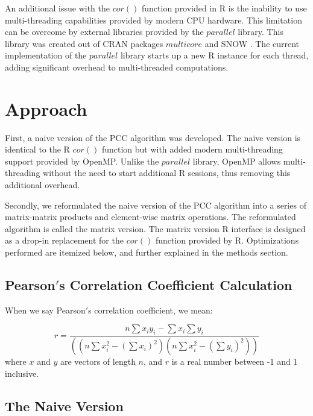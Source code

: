 \documentclass{bioinfo}
\begin{document}
An additional issue with the $cor()$ function provided in R is the inability to 
use multi-threading capabilities provided by modern CPU hardware. This limitation 
can be overcome by external libraries provided by the $parallel$ library. This 
library was created out of CRAN packages $multicore$ \citep{Urbanek2009} and 
SNOW \citep{Tierney2003}. The current implementation of the $parallel$ library 
starts up a new R instance for each thread, adding significant overhead to 
multi-threaded computations.

\vspace*{-6pt}

\section{Approach}
First, a naive version of the PCC algorithm was developed. The naive version is 
identical to the R $cor()$ function but with added modern multi-threading 
support provided by OpenMP. Unlike the $parallel$ library, OpenMP allows 
multi-threading without the need to start additional R sessions, thus removing 
this additional overhead.

Secondly, we reformulated the naive version of the PCC algorithm into a series of 
matrix-matrix products and element-wise matrix operations. The 
reformulated algorithm is called the matrix version. The matrix version 
R interface is designed as a drop-in replacement for the $cor()$ 
function provided by R. Optimizations performed are itemized below, and further 
explained in the methods section.

\subsection{Pearson$'$s Correlation Coefficient Calculation}
When we say Pearson$'$s correlation coefficient, we mean:

\begin{equation}
r=\frac{n\sum x_iy_i-\sum x_i\sum y_i}{((n\sum x_i^2-(\sum x_i)^2)(n\sum x_i^2-(\sum y_i)^2))}
\end{equation}
where $x$ and $y$ are vectors of length $n$, and $r$ is a real number between -1 and 1 inclusive.

\subsection{The Naive Version}
\end{document}
